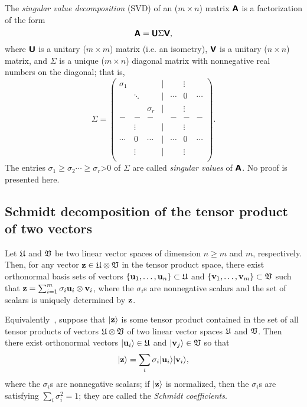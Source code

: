The {\em singular value decomposition}
(SVD)
of an ($m\times n$)  matrix $\textsf{\textbf{A}}$ is a factorization of the form
\begin{equation}
\textsf{\textbf{A}} = \textsf{\textbf{U}} \Sigma \textsf{\textbf{V}} ,
\end{equation}
where
$\textsf{\textbf{U}}$ is a unitary ($m\times m$)  matrix (i.e. an isometry),
$\textsf{\textbf{V}}$ is a unitary ($n\times n$)  matrix,
and
$\Sigma$ is a unique ($m\times n$)   diagonal matrix with nonnegative real numbers on the diagonal;
that is,
\begin{equation}
\Sigma =
\begin{pmatrix}
\sigma_1&&&{|}&&\vdots& \\
  &\ddots &&{|}&\cdots &0&\cdots \\
&&\sigma_r&{|}&&\vdots& \\
-&-&-&&-&-&- \\
&\vdots&&{|}&&\vdots& \\
\cdots &0&\cdots &{|}&\cdots &0&\cdots \\
&\vdots&&{|}&&\vdots& \\
\end{pmatrix}.
\end{equation}
The entries $\sigma_1\ge \sigma_2 \cdots \ge \sigma_r$>0 of $\Sigma$ are called {\em singular values}
of $\textsf{\textbf{A}}$.  No proof is presented here.

\subsection{Schmidt decomposition of the tensor product of two vectors}
\label{2011-m-Schmidtdecomposition}

Let  ${\frak U}$  and   ${\frak V}$ be
two linear vector spaces
of dimension $n\ge m$ and $m$, respectively.
Then, for any vector
${\bf z} \in {\frak U}\otimes {\frak V}$
in the tensor product space,
there exist
orthonormal basis sets of vectors
$\{ {\bf u}_1, \ldots ,{\bf u}_n \}  \subset  {\frak U}$
and
$\{ {\bf v}_1, \ldots ,{\bf v}_m \}  \subset  {\frak V}$
such that
${\bf z}=\sum_{i=1}^m
\sigma_i  {\bf u}_i \otimes  {\bf v}_i$,
where the $\sigma_i$s are nonnegative scalars and the set of scalars is uniquely determined by
${\bf z}$.

Equivalently~\cite{nielsen-book}, suppose that
$\vert {\bf z}\rangle $
 is some tensor product  contained in   the set of all tensor products of vectors
$ {\frak U}\otimes {\frak V}$ of     two linear vector spaces
 ${\frak U}$  and   ${\frak V}$.
Then there exist orthonormal vectors
$ \vert {\bf u}_i  \rangle \in  {\frak U}$
and
$ \vert {\bf v}_j  \rangle \in  {\frak V}$
so that
\begin{equation}
  \vert {\bf z}\rangle = \sum_i \sigma_i   \vert {\bf u}_i  \rangle  \vert {\bf v}_i  \rangle ,
\label{2011-e-sd}
\end{equation}
where the  $\sigma_i$s are nonnegative scalars; if $  \vert {\bf z}\rangle$
is normalized, then the  $\sigma_i$s are  satisfying
$\sum_i \sigma_i^2=1$;
they are called the
{\em Schmidt coefficients}.

